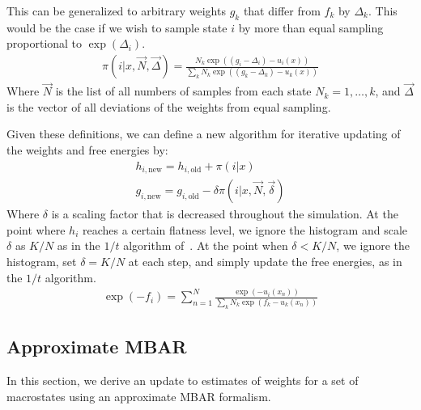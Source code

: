 \documentclass[superscriptaddress,showkeys, nofootinbib, pre, aps]{revtex4-1}
\begin{document}
This can be generalized to arbitrary weights $g_k$ that differ from
$f_k$ by $\Delta_k$.  This would be the case if we wish to sample
state $i$ by more than equal sampling proportional to
$\exp(\Delta_i)$.
\begin{eqnarray}
\pi(i|x,\vec{N},\vec{\Delta}) = \frac{N_k\exp((g_i-\Delta_i)-u_i(x))}{\sum_k N_k \exp((g_k-\Delta_k)-u_k(x))}
\end{eqnarray}
Where $\vec{N}$ is the list of all numbers of samples from each state
$N_k=1,\ldots,k$, and $\vec{\Delta}$ is the vector of all deviations
of the weights from equal sampling.

Given these definitions, we can define a new algorithm for iterative
updating of the weights and free energies by:
\begin{eqnarray}
h_{i,\mathrm{new}} = h_{i,\mathrm{old}}+\pi(i|x) \\
g_{i,\mathrm{new}} = g_{i,\mathrm{old}} - \delta \pi(i|x,\vec{N},\vec{\delta})
\end{eqnarray}
Where $\delta$ is a scaling factor that is decreased throughout the simulation.  At the point where $h_i $ reaches a certain flatness level, we ignore the histogram and scale $\delta$ as $K/N$ as in the $1/t$ algorithm of~\citet{Belardinelli2007}.  At the point when
$\delta < K/N$, we ignore the histogram, set $\delta = K/N$ at each
step, and simply update the free energies, as in the $1/t$ algorithm.
\begin{eqnarray}
\exp(-f_i) = \sum_{n=1}^N \frac{\exp(-u_i(x_n))}{\sum_k N_k \exp(f_k-u_k(x_n))}
\label{eq:MBAR}
\end{eqnarray}

\subsection{\label{sec:ambar}Approximate MBAR}
In this section, we derive an update to estimates of weights for a set of macrostates using an approximate MBAR formalism.
\end{document}
